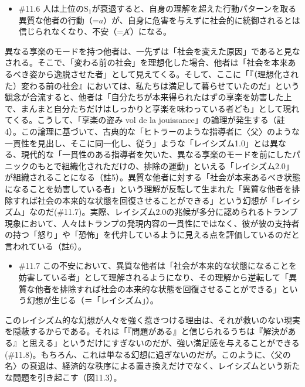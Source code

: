 \begin{note}{}
  \begin{itemize}
    \tightlist
    \item{\#11.6}
      人は上位の$\textrm{S}_1$が衰退すると、自身の理解を超えた行動パターンを取る異質な他者の行動（=$a$）が、自身に危害を与えずに社会的に統御されるとは信じられなくなり、不安（=$\cancel{\textrm{A}}$）になる。
  \end{itemize}
\end{note}

異なる享楽のモードを持つ他者は、一先ずは「社会を変えた原因」であると見なされる。そこで、「変わる前の社会」を理想化した場合、他者は「社会を本来あるべき姿から逸脱させた者」として見えてくる。そして、ここに「『（理想化された）変わる前の社会』においては、私たちは満足して暮らせていたのだ」という観念が合流すると、他者は「自分たちが本来得られたはずの享楽を妨害した上で、まんまと自分たちだけはしっかりと享楽を味わっている者ども」として現れてくる。こうして、「享楽の盗み
vol de la
jouissance」の論理が発生する（註4）。この論理に基づいて、古典的な「ヒトラーのような指導者に〈父〉のような一貫性を見出し、そこに同一化し、従う」ような「レイシズム1.0」とは異なる、現代的な「一貫性のある指導者を欠いた、異なる享楽のモードを前にしたパニックのもとで組織化されただけの、排除の運動」といえる「レイシズム2.0」が組織されることになる（註5）。異質な他者に対する「社会が本来あるべき状態になることを妨害している者」という理解が反転して生まれた「異質な他者を排除すれば社会の本来的な状態を回復させることができる」という幻想が「レイシズム」なのだ(\#11.7)。実際、レイシズム2.0の兆候が多分に認められるトランプ現象において、人々はトランプの発現内容の一貫性にではなく、彼が彼の支持者の持つ「怒り」や「恐怖」を代弁しているように見える点を評価しているのだと言われている（註6）。

\begin{note}{}
  \begin{itemize}
    \tightlist
    \item{\#11.7}
      この不安において、異質な他者は「社会が本来的な状態になることを妨害している者」として理解されるようになり、その理解から逆転して「異質な他者を排除すれば社会の本来的な状態を回復させることができる」という幻想が生じる（＝「レイシズム」）。
  \end{itemize}
\end{note}

このレイシズム的な幻想が人々を強く惹きつける理由は、それが救いのない現実を隠蔽するからである。それは「『問題がある』と信じられるうちは『解決がある』と思える」というだけにすぎないのだが、強い満足感を与えることができる(\#11.8)。もちろん、これは単なる幻想に過ぎないのだが。このように、〈父の名〉の衰退は、経済的な秩序による置き換えだけでなく、レイシズムという新たな問題を引き起こす（図11.3）。

